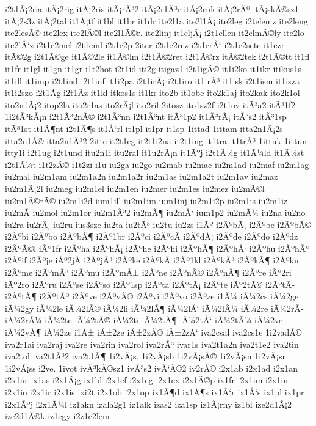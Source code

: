 {i2t1Ã¡2ria
itÃ¡2rig
itÃ¡2ris
itÃ¡rÃ³2
itÃ¡2r1Ã³r
itÃ¡2ruk
itÃ¡2rÃº
itÃ¡skÃ©sz1
itÃ¡2s3z
itÃ¡2tal
it1Ã¡tf
it1bl
it1br
it1dr
ite2l1a
ite2l1Ã¡
ite2leg
i2telemz
ite2leng
ite2lesÃ©
ite2lex
ite2lÃ©l
ite2l1Ã©r.
ite2linj
it1eljÃ¡
i2t1ellen
it2elmÃ©ly
ite2lo
ite2lÅ‘z
i2t1e2mel
i2t1eml
i2t1e2p
2iter
i2t1e2rez
i2t1erÅ‘
i2t1e2sete
it1ezr
itÃ©2g
i2t1Ã©ge
it1Ã©2le
it1Ã©lm
i2t1Ã©2ret
i2t1Ã©rz
itÃ©2tek
i2t1Ã©tt
it1fl
it1fr
it1gl
it1gn
it1gr
i1t2hot
i2t1id
iti2g
itigaz1
i2t1igÃ©
it1i2ko
it1ikr
itikus1s
it1ill
it1imp
i2t1ind
i2t1inf
it1i2pa
i2t1irÃ¡
i2t1iro
it1irÃ³
it1isk
i2t1ism
it1isza
it1i2szo
i2t1Ã­g
i2t1Ã­z
it1kl
itkos1s
it1kr
ito2b
it1obe
ito2k1aj
ito2kak
ito2k1ol
ito2n1Ã¡2
itop2la
ito2r1as
ito2rÃ¡l
ito2ril
2itosz
ito1sz2f
i2t1ov
itÃ³a2
itÃ³1f2
1i2tÃ³kÃ¡n
i2t1Ã³2nÃ©
i2t1Ã³nn
i2t1Ã³nt
itÃ³1p2
it1Ã³rÃ¡
itÃ³s2
itÃ³1sp
itÃ³1st
it1Ã¶nt
i2t1Ã¶s
it1Å‘rl
it1pl
it1pr
it1sp
1ittad
1ittam
itta2n1Ã¡2s
itta2n1Ã©
itta2n1Ã³2
2itte
it2t1eg
it2t1i2na
it2t1ing
it1tra
it1trÃ³
1ittuk
1ittun
itty1i
i2t1ug
i2t1und
itu2n1i
itu2ral
it1u2rÃ¡n
it1Ãºj
i2t1Ã¼g
it1Ã¼ld
it1Ã¼st
i2t1Ã¼t
i1t2zÃ©
i1t2zi
i1u
iu2ga
iu2go
iu2mab
iu2mac
iu2m1ad
iu2maf
iu2m1ag
iu2mal
iu2m1am
iu2m1a2n
iu2m1a2r
iu2m1as
iu2m1a2t
iu2m1av
iu2maz
iu2m1Ã¡2l
iu2meg
iu2m1el
iu2m1en
iu2mer
iu2m1es
iu2mez
iu2mÃ©l
iu2m1Ã©rÃ©
iu2m1i2d
ium1ill
iu2m1im
ium1inj
iu2m1i2p
iu2m1is
iu2m1iz
iu2mÃ­
iu2mol
iu2m1or
iu2m1Ã³2
iu2mÃ¶
iu2mÅ‘
ium1p2
iu2mÃ¼
iu2na
iu2no
iu2ra
iu2rÃ¡
iu2ru
ius3sze
iu2ta
iu2tÃ³
iu2tu
iu2zs
i1Ãº
i2ÃºbÃ¡
i2Ãºbe
i2ÃºbÃ©
i2Ãºbi
i2Ãºbo
i2ÃºbÃ¶
i2Ãº1br
i2Ãºci
i2ÃºcÃ­
i2ÃºdÃ¡
i2Ãºde
i2Ãºdo
i2Ãºdz
i2ÃºÃ©l
iÃº1fr
i2Ãºha
i2ÃºhÃ¡
i2Ãºhe
i2Ãºhi
i2ÃºhÃ¶
i2ÃºhÅ‘
i2Ãºhu
i2ÃºhÃº
i2Ãºif
i2Ãºje
iÃº2jÃ­
i2ÃºjÃ³
i2Ãºke
i2ÃºkÃ­
i2Ãº1kl
i2ÃºkÃ³
i2ÃºkÃ¶
i2Ãºku
i2Ãºme
i2ÃºmÃ³
i2Ãºmu
i2ÃºmÅ±
i2Ãºne
i2ÃºnÃ©
i2ÃºnÃ¶
i2Ãºre
iÃº2ri
iÃº2ro
i2Ãºru
i2Ãºse
i2Ãºso
i2Ãº1sp
i2Ãºta
i2ÃºtÃ¡
i2Ãºte
iÃº2tÃ©
i2ÃºtÃ­
i2ÃºtÃ¶
i2ÃºtÃº
i2Ãºve
i2ÃºvÃ©
i2Ãºvi
i2Ãºvo
i2Ãºze
i1Ã¼
iÃ¼2cs
iÃ¼2ge
iÃ¼2gy
iÃ¼2le
iÃ¼2lÃ©
iÃ¼2li
iÃ¼2lÃ¶
iÃ¼2lÅ‘
iÃ¼2lÃ¼
iÃ¼2re
iÃ¼2rÃ­
iÃ¼2rÃ¼
iÃ¼2te
iÃ¼2tÃ©
iÃ¼2ti
iÃ¼2tÃ¶
iÃ¼2tÅ‘
iÃ¼2tÃ¼
iÃ¼2ve
iÃ¼2vÃ¶
iÃ¼2ze
i1Å±
iÅ±2ze
iÅ±2zÃ©
iÅ±2zÅ‘
iva2csal
iva2cs1e
1i2vadÃ©
iva2r1ai
iva2raj
iva2re
iva2rin
iva2rol
iva2rÃ³
ivar1s
iva2t1a2n
iva2t1e2
iva2tin
iva2tol
iva2t1Ã³2
iva2t1Ã¶
1i2vÃ¡s.
1i2vÃ¡sb
1i2vÃ¡sÃ©
1i2vÃ¡sn
1i2vÃ¡sr
1i2vÃ¡ss
i2ve.
1ivot
ivÃ³kÃ©sz1
ivÃ³s2
ivÅ‘Ã©2
iv2rÃ©
i2x1ab
i2x1ad
i2x1an
i2x1ar
ix1as
i2x1Ã¡g
ix1bl
i2x1ef
i2x1eg
i2x1ex
i2x1Ã©p
ix1fr
i2x1im
i2x1in
i2x1io
i2x1ir
i2x1is
ixi2t
i2x1ob
i2x1op
ix1Ã¶d
ix1Ã¶s
ix1Å‘r
ix1Å‘s
ix1pl
ix1pr
i2x1Ãºj
i2x1Ã¼l
iz1akn
izala2g1
iz1alk
izas2
iza1sp
iz1Ã¡rny
iz1bl
ize2d1Ã¡2
ize2d1Ã©k
iz1egy
i2z1e2lem
}
